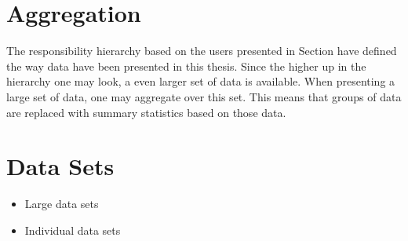 \clearpage
\section{Aggregation} %
\label{sec:back_aggregation}
The responsibility hierarchy based on the users presented in Section  have 
defined the way data have been presented in this thesis. Since the higher up in the
hierarchy one may look, a even larger set of data is available. When presenting
a large set of data, one may aggregate over this set. This means that groups of
data are replaced with summary statistics based on those data\cite{wikiAggregation}. 


\clearpage
\section{Data Sets} %
\label{sec:back_data_sets}

\begin{itemize}
	\item Large data sets
	\item Individual data sets
\end{itemize}
